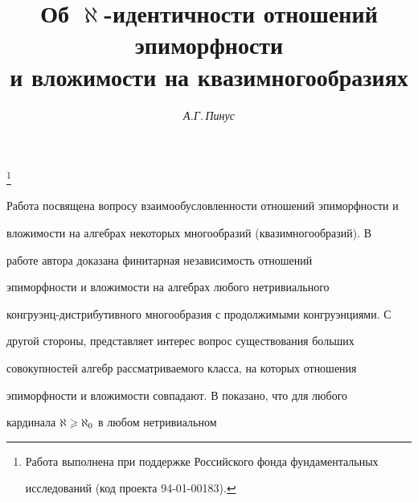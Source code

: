 

\author{\it А.Г.\,Пинус}


\title{Об $\aleph$-идентичности отношений эпиморфности\\


и вложимости на квазимногообразиях}





\thanks{Работа выполнена при поддержке Российского фонда фундаментальных


исследований (код проекта 94-01-00183).}


\date{}







\pagestyle{plain} %













\maketitle













Работа посвящена вопросу взаимообусловленности отношений эпиморфности и


вложимости на алгебрах некоторых многообразий (квазимногообразий). В


работе автора \cite{P1} доказана финитарная независимость отношений


эпиморфности и вложимости на алгебрах любого нетривиального


конгруэнц-дистрибутивного многообразия с продолжимыми конгруэнциями. С


другой стороны, представляет интерес вопрос существования больших


совокупностей алгебр рассматриваемого класса, на которых отношения


эпиморфности и вложимости совпадают. В \cite{P2} показано, что для любого


кардинала $\aleph\geqslant\aleph_0$ в любом нетривиальном



